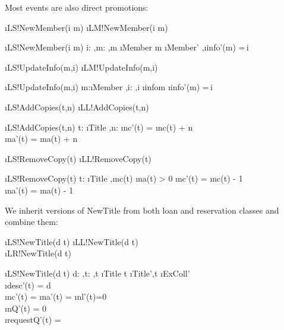 \documentclass[12pt,a4paper]{article}
\begin{document}
\bigskip\noindent Most events are also direct promotions:
\begin{showspecs}
	\begin{spec}{\i{LS!NewMember(i \to m)}}
		\i{LM!NewMember(i \to m)}
	\end{spec}
\showbeside
	\begin{spec}[\equiv]{\i{LS!NewMember(i \to m)}}
		i: \sep m: \sep m \notin \i{Member}
	\post	m \in \i{Member'} \sep \i{info'}(m) =\,i
	\end{spec}
\showmore
	\begin{spec}{\i{LS!UpdateInfo(m,i)}}
		\i{LM!UpdateInfo(m,i)}
	\end{spec}
\showbeside
	\begin{spec}[\equiv]{\i{LS!UpdateInfo(m,i)}}
		m:\i{Member} \sep i: \sep i \neq \i{info}\;m
	\post	\i{info'}(m) =\,i
	\end{spec}
\showmore
	\begin{spec}{\i{LS!AddCopies(t,n)}}	
		\i{LL!AddCopies(t,n)}
	\end{spec}
\showbeside
	\begin{spec}[\equiv]{\i{LS!AddCopies(t,n)}}	
		t: \i{Title} \sep n: 
	\post  \i{nc'}(t) = \i{nc}(t) + n\\
            \i{na'}(t) = \i{na}(t) + n
	\end{spec}
\showmore
	\begin{spec}{\i{LS!RemoveCopy(t)}}	
		\i{LL!RemoveCopy(t)}
	\end{spec}
\showbeside
	\begin{spec}[\equiv]{\i{LS!RemoveCopy(t)}}	
		t: \i{Title} \sep \i{nc}(t) \geq \i{na}(t) > 0
	\post	
		\i{nc'}(t) = \i{nc}(t) - 1\\
		\i{na'}(t) = \i{na}(t) - 1
	\end{spec}
\end{showspecs}

\newpage
\noindent We inherit versions of NewTitle from both loan and reservation classes and combine them:

\begin{showspecs}
\showmore\begin{spec}{\i{LS!NewTitle(d \to t)}}
		\i{LL!NewTitle(d \to t)}\\[0.25ex]
		\i{LR!NewTitle(d \to t)}
	\end{spec}
\showbeside
	\begin{spec}[\equiv]{\i{LS!NewTitle(d \to t)}}
		d: \sep t: \sep t \notin \i{Title}
	\post	t \in\!\i{Title'}\sep t \in\!\i{ExColl'}\\
        \i{desc'}(t) = d\\
		\i{nc'}(t) = \i{na'}(t) = \i{nl'}(t)=0\\[0.25ex]
        \i{nQ'}(t) = 0\\
		\i{requestQ'}(t) = \langle\rangle
	\end{spec}
\end{showspecs}
\end{document}
